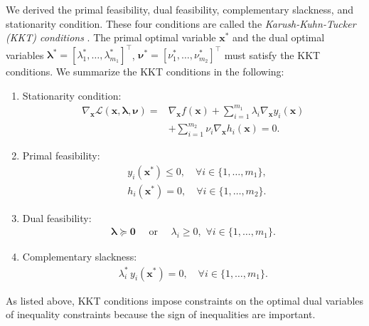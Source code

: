 \documentclass[lang=cn,10pt]{gorgeousnbook}
\numberwithin{equation}{section}%
\numberwithin{figure}{section}%
\begin{document}
We derived the primal feasibility, dual feasibility, complementary slackness, and stationarity condition. These four conditions are called the \textit{Karush-Kuhn-Tucker (KKT) conditions} \cite{karush1939minima,kuhn1951nonlinear}. 
The primal optimal variable $\boldsymbol{x}^*$ and the dual optimal variables $\boldsymbol{\lambda}^* = [\lambda_1^*, \dots, \lambda_{m_1}^*]^\top$, $\boldsymbol{\nu}^* = [\nu_1^*, \dots, \nu_{m_2}^*]^\top$ must satisfy the KKT conditions. 
We summarize the KKT conditions in the following: 
\begin{enumerate}
\item Stationarity condition:
\begin{equation}\label{equation_stationarity_condition}
\begin{aligned}
\nabla_{\boldsymbol{x}} \mathcal{L}(\boldsymbol{x},\boldsymbol{\lambda},\boldsymbol{\nu}) = &\nabla_{\boldsymbol{x}} f(\boldsymbol{x}) + \sum_{i=1}^{m_1} \lambda_i \nabla_{\boldsymbol{x}} y_i(\boldsymbol{x}) \\
&+ \sum_{i=1}^{m_2} \nu_i \nabla_{\boldsymbol{x}} h_i(\boldsymbol{x}) = 0.
\end{aligned}
\end{equation}
\item Primal feasibility:
\begin{align}
& y_i(\boldsymbol{x}^*) \leq 0, \quad \forall i \in \{1, \ldots, m_1\}, \\
& h_i(\boldsymbol{x}^*) = 0, \quad \forall i \in \{1, \ldots, m_2\}.
\end{align}
\item Dual feasibility:
\begin{align}\label{equation_dual_constraints}
\boldsymbol{\lambda} \succeq \boldsymbol{0} \quad\text{ or }\quad \lambda_i \geq 0, \,\, \forall i \in \{1, \dots, m_1\}.
\end{align}
\item Complementary slackness:
\begin{align}
\lambda_i^*\, y_i(\boldsymbol{x}^*) = 0, \quad \forall i \in \{1, \dots, m_1\}.
\end{align}
\end{enumerate}
As listed above, KKT conditions impose constraints on the optimal dual variables of inequality constraints because the sign of inequalities are important. 
\end{document}
